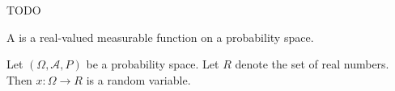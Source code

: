 
\sbasic



\sstart



TODO


A
is a real-valued measurable function
on a probability space.


Let $(\Omega, \mathcal{A}, P)$
be a probability space.
Let $R$ denote the set
of real numbers.
Then $x: \Omega \to R$
is a random variable.

\strats
